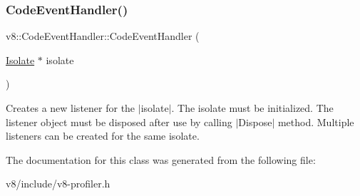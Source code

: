 \subsubsection{\texorpdfstring{Code\+Event\+Handler()}{CodeEventHandler()}}
{\footnotesize\ttfamily v8\+::\+Code\+Event\+Handler\+::\+Code\+Event\+Handler (\begin{DoxyParamCaption}\item[{\mbox{\hyperlink{classv8_1_1Isolate}{Isolate}} $\ast$}]{isolate }\end{DoxyParamCaption})\hspace{0.3cm}{\ttfamily [explicit]}}

Creates a new listener for the $\vert$isolate$\vert$. The isolate must be initialized. The listener object must be disposed after use by calling $\vert$\+Dispose$\vert$ method. Multiple listeners can be created for the same isolate. 

The documentation for this class was generated from the following file\+:\begin{DoxyCompactItemize}
\item 
v8/include/v8-\/profiler.\+h\end{DoxyCompactItemize}

